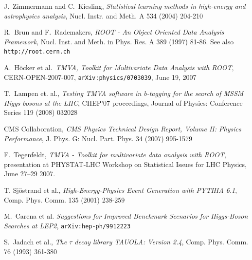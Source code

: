 \documentclass[a4paper]{jpconf}
\begin{document}
\begin{thebibliography}{9}


 J.~Zimmermann and C.~Kiesling,
\emph{Statistical learning methods in high-energy and astrophysics analysis},
Nucl. Instr. and Meth. A 534 (2004) 204-210

 R.~Brun and F.~Rademakers, \emph{ROOT - An Object Oriented Data Analysis Framework},
Nucl. Inst. and Meth. in Phys. Res. A 389 (1997) 81-86. See also {\tt http://root.cern.ch}


 A.~H\"{o}cker et al.~\emph{TMVA, Toolkit for Multivariate Data Analysis with ROOT}, 
CERN-OPEN-2007-007, {\tt arXiv:physics/0703039}, June 19, 2007


 T.~Lampen et. al., \emph{Testing TMVA software in b-tagging 
                  for the search of MSSM Higgs bosons at the LHC},
CHEP’07 proceedings, Journal of Physics: Conference Series 119 (2008) 032028

 {CMS Collaboration}, \emph{{CMS} Physics Technical Design Report, Volume {II}:
             Physics Performance}, J. Phys. G: Nucl. Part. Phys. 34 (2007) 995-1579

 F.~Tegenfeldt, \emph{TMVA - Toolkit for multivariate
data analysis with ROOT}, presentation at PHYSTAT-LHC Workshop on
Statistical Issues for LHC Physics, June 27--29 2007.

 T. Sj\"ostrand et al., \emph{High-Energy-Physics
  Event Generation with {PYTHIA} 6.1}, Comp. Phys. Comm. 135 (2001) 238-259


 M.~Carena et al. \emph{Suggestions for Improved Benchmark Scenarios for Higgs-Boson Searches at LEP2}, 
{\tt arXiv:hep-ph/9912223} %

 S.~Jadach et al., \emph{The $\tau$ decay library
  {TAUOLA}: Version 2.4}, Comp. Phys. Comm. 76 (1993) 361-380


\end{thebibliography}
\end{document}

